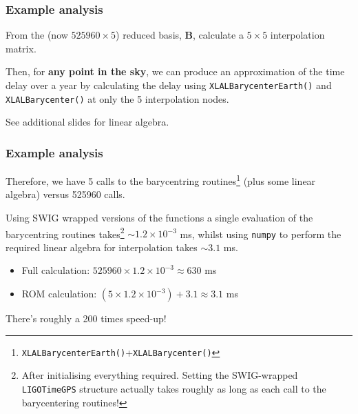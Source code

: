 \begin{frame}

\frametitle{Example analysis}
\label{exampleanalysis}

From the (now $525960 \times 5$) reduced basis, $\mathbf{B}$, calculate a $5\times 5$ interpolation matrix.

Then, for \textbf{any point in the sky}, we can produce an approximation of the time delay over a year by calculating
the delay using \texttt{XLALBarycenterEarth()} and \texttt{XLALBarycenter()} at only the 5 interpolation nodes.

See additional slides for linear algebra.

\end{frame}

\begin{frame}

\frametitle{Example analysis}
\label{exampleanalysis}

Therefore, we have 5 calls to the barycentring routines\footnote{\texttt{XLALBarycenterEarth()}+\texttt{XLALBarycenter()}} (plus some linear algebra) versus 525960 calls.

Using SWIG wrapped versions of the functions a single evaluation of the barycentring routines
takes\footnote{After initialising everything required. Setting the SWIG-wrapped \texttt{LIGOTimeGPS} structure
actually takes roughly as long as each call to the barycentering routines!} $\sim 1.2\!\times\!10^{-3}$ ms, whilst using \texttt{numpy} to perform the required linear algebra
for interpolation takes $\sim 3.1$ ms.

\begin{itemize}
\item Full calculation: $525960 \times 1.2\!\times\!10^{-3} \approx 630$ ms

\item ROM calculation: $(5 \times 1.2\!\times\!10^{-3}) + 3.1 \approx 3.1$ ms

\end{itemize}

There's roughly a 200 times speed-up!

\end{frame}


